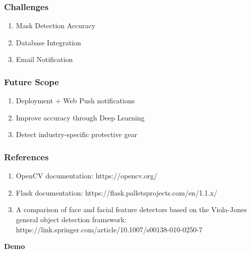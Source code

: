 \documentclass[14pt]{beamer}
\begin{document}
\begin{frame}
    \frametitle{Challenges}
    \begin{enumerate}
        \item Mask Detection Accuracy
        \item Database Integration
        \item Email Notification 
    \end{enumerate}
\end{frame}


\begin{frame}
    \frametitle{Future Scope}
    \begin{enumerate}
        \item Deployment + Web Push notifications
        \item Improve accuracy through Deep Learning
        \item Detect industry-specific protective gear
    \end{enumerate}
\end{frame}

\begin{frame}
    \frametitle{References}
    \begin{enumerate}
        \item OpenCV documentation: 
        https://opencv.org/
        \item Flask documentation: 
        https://flask.palletsprojects.com/en/1.1.x/
        \item A comparison of face and facial feature detectors based on the Viola-Jones general object detection framework: 
        https://link.springer.com/article/10.1007/s00138-010-0250-7
    \end{enumerate}
\end{frame}

\begin{frame}[c]{ }
    \centering
\huge \textbf{Demo}
\end{frame}
\end{document}
